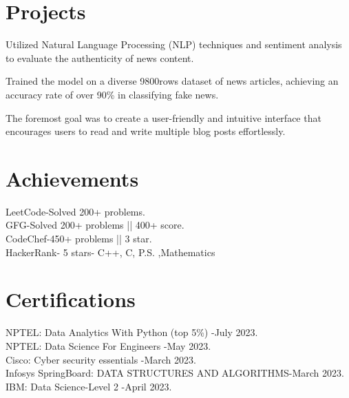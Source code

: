\documentclass[]{deedy-resume-openfont}
\begin{document}
\begin{minipage}[t]{0.66\textwidth}
\section{Projects}
  
\begin{tightemize}
\item Utilized Natural Language Processing (NLP) techniques and sentiment analysis to evaluate the authenticity of news content.
\item Trained the model on a diverse 9800rows dataset of news articles, achieving an accuracy rate of over 90\% in classifying fake news.
\end{tightemize}
\sectionsep
{}  
\begin{tightemize}
\item The foremost goal was to create a user-friendly and intuitive interface that encourages users to read and write multiple blog posts effortlessly.
\end{tightemize}

\sectionsep

\section{Achievements}
\textbullet LeetCode-Solved 200+ problems.\\
\textbullet GFG-Solved 200+ problems || 400+ score.\\
\textbullet CodeChef-450+ problems || 3 star.\\
\textbullet HackerRank- 5 stars- C++, C, P.S. ,Mathematics\\
\sectionsep

\section{Certifications}
\textbullet NPTEL: Data Analytics With Python (top 5\%) -July 2023.\\
\textbullet NPTEL: Data Science For Engineers -May \textbf{}2023.\\
\textbullet Cisco: Cyber security essentials -March 2023.\\
\textbullet Infosys SpringBoard: DATA STRUCTURES AND ALGORITHMS-March 2023.\\
\textbullet IBM: Data Science-Level 2 -April 2023.\\
\sectionsep

\end{minipage}
\end{document}
